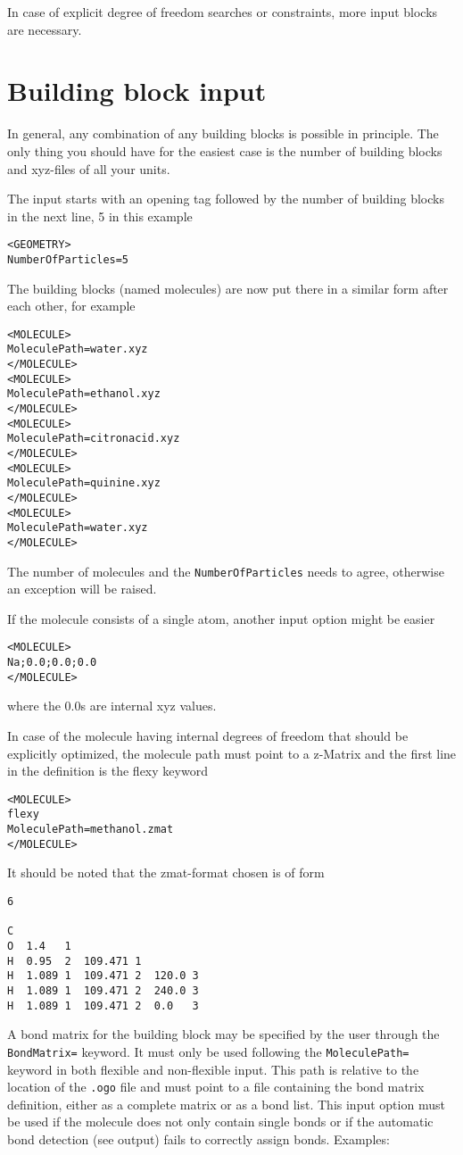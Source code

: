 \documentclass[a4paper,10pt]{scrbook}
\begin{document}
In case of explicit degree of freedom searches or constraints, more input blocks
are necessary.

\section{Building block input}
In general, any combination of any building blocks is possible in principle. The
only thing you should have for the easiest case is the number of building blocks
and xyz-files of all your units.

The input starts with an opening tag followed by the number of building blocks
in the next line, 5 in this example
\begin{verbatim}
<GEOMETRY>
NumberOfParticles=5
\end{verbatim}
The building blocks (named molecules) are now put there in a similar form after
each other, for example
\begin{verbatim}
<MOLECULE>
MoleculePath=water.xyz
</MOLECULE>
<MOLECULE>
MoleculePath=ethanol.xyz
</MOLECULE>
<MOLECULE>
MoleculePath=citronacid.xyz
</MOLECULE>
<MOLECULE>
MoleculePath=quinine.xyz
</MOLECULE>
<MOLECULE>
MoleculePath=water.xyz
</MOLECULE>
\end{verbatim}
The number of molecules and the \texttt{NumberOfParticles} needs to agree,
otherwise an exception will be raised.

If the molecule consists of a single atom, another input option might be easier
\begin{verbatim}
<MOLECULE>
Na;0.0;0.0;0.0
</MOLECULE>
\end{verbatim}
where the 0.0s are internal xyz values.

In case of the molecule having internal degrees of freedom that should be
explicitly optimized, the molecule path must point to a z-Matrix and the
first line in the definition is the flexy keyword
\begin{verbatim}
<MOLECULE>
flexy
MoleculePath=methanol.zmat
</MOLECULE>
\end{verbatim}
It should be noted that the zmat-format chosen is of form
\begin{verbatim}
6

C
O  1.4   1
H  0.95  2  109.471 1
H  1.089 1  109.471 2  120.0 3
H  1.089 1  109.471 2  240.0 3
H  1.089 1  109.471 2  0.0   3
\end{verbatim}

A bond matrix for the building block may be specified by the user through the
\texttt{BondMatrix=} keyword. It must only be used following the
\texttt{MoleculePath=} keyword in both flexible and non-flexible input. This
path is relative to the location of the \texttt{.ogo} file and must point to
a file containing the bond matrix definition, either as a
complete matrix or as a bond list. This input option must be used if the molecule
does not only contain single bonds or if the automatic bond detection (see output)
fails to correctly assign bonds. Examples:
\end{document}
